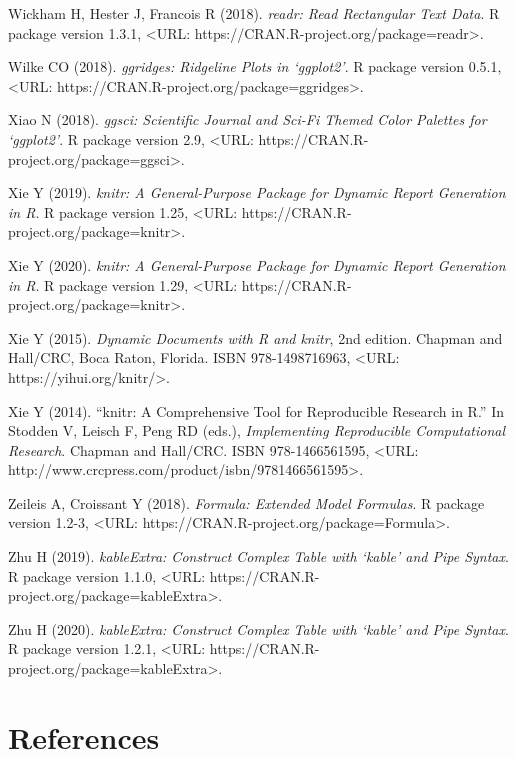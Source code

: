 \documentclass{puthesis}
\begin{document}
Wickham H, Hester J, Francois R (2018). \emph{readr: Read Rectangular
Text Data}. R package version 1.3.1, \textless URL:
https://CRAN.R-project.org/package=readr\textgreater.

Wilke CO (2018). \emph{ggridges: Ridgeline Plots in `ggplot2'}. R
package version 0.5.1, \textless URL:
https://CRAN.R-project.org/package=ggridges\textgreater.

Xiao N (2018). \emph{ggsci: Scientific Journal and Sci-Fi Themed Color
Palettes for `ggplot2'}. R package version 2.9, \textless URL:
https://CRAN.R-project.org/package=ggsci\textgreater.

Xie Y (2019). \emph{knitr: A General-Purpose Package for Dynamic Report
Generation in R}. R package version 1.25, \textless URL:
https://CRAN.R-project.org/package=knitr\textgreater.

Xie Y (2020). \emph{knitr: A General-Purpose Package for Dynamic Report
Generation in R}. R package version 1.29, \textless URL:
https://CRAN.R-project.org/package=knitr\textgreater.

Xie Y (2015). \emph{Dynamic Documents with R and knitr}, 2nd edition.
Chapman and Hall/CRC, Boca Raton, Florida. ISBN 978-1498716963,
\textless URL: https://yihui.org/knitr/\textgreater.

Xie Y (2014). ``knitr: A Comprehensive Tool for Reproducible Research in
R.'' In Stodden V, Leisch F, Peng RD (eds.), \emph{Implementing
Reproducible Computational Research}. Chapman and Hall/CRC. ISBN
978-1466561595, \textless URL:
http://www.crcpress.com/product/isbn/9781466561595\textgreater.

Zeileis A, Croissant Y (2018). \emph{Formula: Extended Model Formulas}.
R package version 1.2-3, \textless URL:
https://CRAN.R-project.org/package=Formula\textgreater.

Zhu H (2019). \emph{kableExtra: Construct Complex Table with `kable' and
Pipe Syntax}. R package version 1.1.0, \textless URL:
https://CRAN.R-project.org/package=kableExtra\textgreater.

Zhu H (2020). \emph{kableExtra: Construct Complex Table with `kable' and
Pipe Syntax}. R package version 1.2.1, \textless URL:
https://CRAN.R-project.org/package=kableExtra\textgreater.

\chapter*{References}



\end{document}

